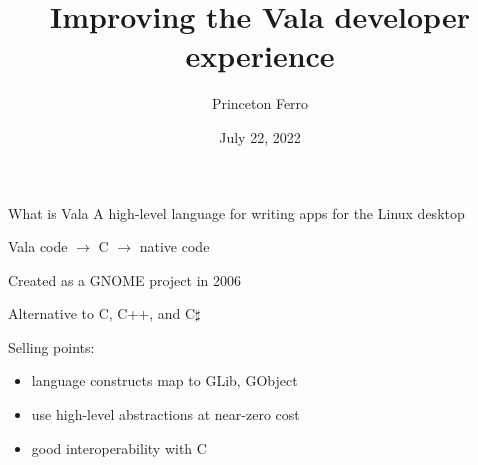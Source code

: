\documentclass[t]{beamer}
\title{Improving the Vala developer experience}
\author{Princeton Ferro}
\date{July 22, 2022}
\begin{document}



\begin{frame}
    \titlepage
\end{frame}

\begin{frame}[c]{What is Vala}
A high-level language for writing apps for the Linux desktop

Vala code $\rightarrow$ C $\rightarrow$ native code

Created as a GNOME project in 2006

Alternative to C, C++, and C\(\sharp\)

Selling points:
\begin{itemize}
    \item language constructs map to GLib, GObject
    \item use high-level abstractions at near-zero cost
    \item good interoperability with C
\end{itemize}
\end{frame}
\end{document}
